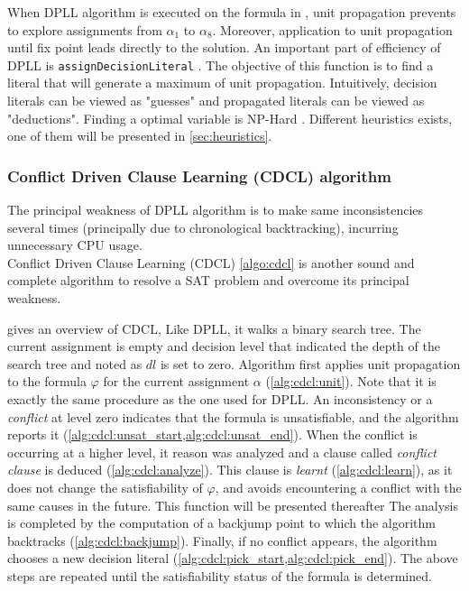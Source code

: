 

When DPLL algorithm is executed on the formula in , unit propagation prevents to 
explore assignments from $\alpha_1 $ to $\alpha_{8}$. Moreover, application to unit propagation until fix point
leads directly to the solution. 
An important part of efficiency of DPLL is \texttt{assignDecisionLiteral} . The objective of this function 
is to find a literal that will generate a maximum of unit propagation. Intuitively, decision literals 
can be viewed as "guesses" and propagated literals can be viewed as "deductions". Finding a optimal variable
is NP-Hard \cite{biere2009handbook}. Different heuristics exists, one of them will be presented in \ref{sec:heuristics}.


%
%
\subsubsection{Conflict Driven Clause Learning (CDCL) algorithm}

The principal weakness of DPLL algorithm is to make same inconsistencies several times
(principally due to chronological backtracking), incurring unnecessary CPU usage.\\
Conflict Driven Clause Learning (CDCL) \cref{algo:cdcl} is another sound and complete algorithm
to resolve a SAT problem and overcome its principal weakness.


 gives an overview of CDCL, Like DPLL,  it walks a binary search tree.
The current assignment is empty and decision level that indicated the depth of the search tree and noted as $dl$ is set to zero.
Algorithm first applies unit propagation to the formula $\varphi$ for the current assignment $\alpha$ (\cref{alg:cdcl:unit}).
Note that it is exactly the same procedure as the one used for DPLL.
An inconsistency or a \emph{conflict} at level zero indicates that the formula is unsatisfiable, and the algorithm
reports it (\cref{alg:cdcl:unsat_start,alg:cdcl:unsat_end}). When the conflict is occurring at a higher level, it
reason was analyzed and a clause called \emph{conflict clause} is deduced (\cref{alg:cdcl:analyze}).
This clause is \emph{learnt} (\cref{alg:cdcl:learn}), as it does not change the
satisfiability of $\varphi$, and avoids encountering a conflict with the same
causes in the future. This function will be presented thereafter
The analysis is completed by the computation of a backjump point to which the algorithm backtracks (\cref{alg:cdcl:backjump}).
Finally, if no conflict appears, the algorithm chooses a new decision literal 
(\cref{alg:cdcl:pick_start,alg:cdcl:pick_end}).
The above steps are repeated until the satisfiability status of the
formula is determined.

